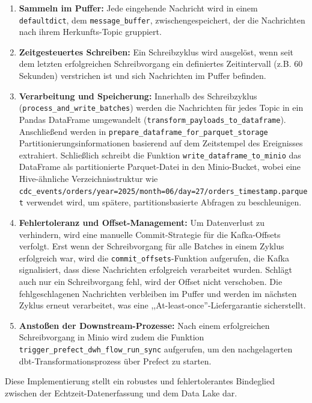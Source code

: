 \documentclass[
    12pt,               
    a4paper,        
    ngerman            
]{scrartcl}
\begin{document}
\begin{enumerate}
    \item \textbf{Sammeln im Puffer:} Jede eingehende Nachricht wird in einem \texttt{defaultdict}, dem \texttt{message\_buffer}, zwischengespeichert, der die Nachrichten nach ihrem Herkunfts-Topic gruppiert.
    
    \item \textbf{Zeitgesteuertes Schreiben:} Ein Schreibzyklus wird ausgelöst, wenn seit dem letzten erfolgreichen Schreibvorgang ein definiertes Zeitintervall (z.B. 60 Sekunden) verstrichen ist und sich Nachrichten im Puffer befinden.
    
    \item \textbf{Verarbeitung und Speicherung:} Innerhalb des Schreibzyklus (\texttt{process\_and\_write\_batches}) werden die Nachrichten für jedes Topic in ein Pandas DataFrame umgewandelt (\texttt{transform\_payloads\_to\_dataframe}). Anschließend werden in \texttt{prepare\_dataframe\_for\_parquet\_storage} Partitionierungsinformationen basierend auf dem Zeitstempel des Ereignisses extrahiert. Schließlich schreibt die Funktion \texttt{write\_dataframe\_to\_minio} das DataFrame als partitionierte Parquet-Datei in den Minio-Bucket, wobei eine Hive-ähnliche Verzeichnisstruktur wie \texttt{cdc\_events/orders/year=2025/month=06/day=27/orders\_timestamp.parquet} verwendet wird, um spätere, partitionsbasierte Abfragen zu beschleunigen.
    
    \item \textbf{Fehlertoleranz und Offset-Management:} Um Datenverlust zu verhindern, wird eine manuelle Commit-Strategie für die Kafka-Offsets verfolgt. Erst wenn der Schreibvorgang für alle Batches in einem Zyklus erfolgreich war, wird die \texttt{commit\_offsets}-Funktion aufgerufen, die Kafka signalisiert, dass diese Nachrichten erfolgreich verarbeitet wurden. Schlägt auch nur ein Schreibvorgang fehl, wird der Offset nicht verschoben. Die fehlgeschlagenen Nachrichten verbleiben im Puffer und werden im nächsten Zyklus erneut verarbeitet, was eine ,,At-least-once''-Liefergarantie sicherstellt.
    
    \item \textbf{Anstoßen der Downstream-Prozesse:} Nach einem erfolgreichen Schreibvorgang in Minio wird zudem die Funktion \texttt{trigger\_prefect\_dwh\_flow\_run\_sync} aufgerufen, um den nachgelagerten dbt-Transformationsprozess über Prefect zu starten.
\end{enumerate}

Diese Implementierung stellt ein robustes und fehlertolerantes Bindeglied zwischen der Echtzeit-Datenerfassung und dem Data Lake dar.
\end{document}
